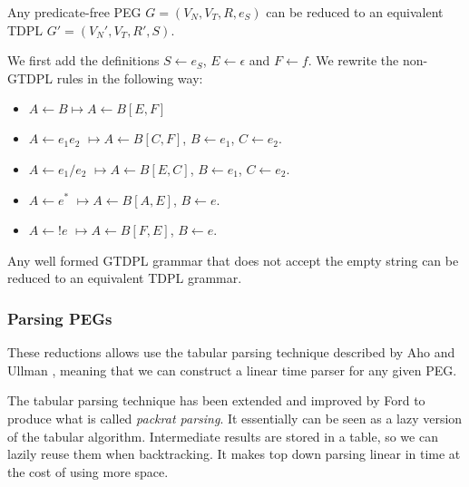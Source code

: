 \begin{frame}
	Any predicate-free PEG $G = (V_N,V_T,R,e_S)$ can be reduced  to an equivalent TDPL $G' = (V_N',V_T,R',S)$.
	
	\begin{block}{}
		We first add the definitions $S \leftarrow e_S$, $E \leftarrow \epsilon$ and $F \leftarrow f$. We rewrite the non-GTDPL rules in the following way:\begin{itemize}
			\item $A \leftarrow B \longmapsto  A \leftarrow B[E, F]$
			\item $A \leftarrow e_1e_2$ $\longmapsto A \leftarrow B[C, F]$, $ B \leftarrow e_1$, $C \leftarrow e_2$.
			\item $A \leftarrow e_1/e_2$ $\longmapsto A \leftarrow B[E, C]$, $ B \leftarrow e_1$, $C \leftarrow e_2$.
			\item $A \leftarrow e^*$ $\longmapsto A \leftarrow B[A, E]$, $ B \leftarrow e$.
			\item $A \leftarrow !e$ $\longmapsto A \leftarrow B[F, E]$, $ B \leftarrow e$.
		\end{itemize}
	\end{block}

	Any well formed GTDPL  grammar that does not accept the empty string  can be reduced to an equivalent TDPL grammar.
\end{frame}

\begin{frame}
	\frametitle{Parsing PEGs}
These reductions allows  use the tabular parsing technique described by Aho and Ullman \cite{10.5555/578789}, meaning that we can construct a linear time parser for any given PEG.
	
	\begin{block}{}
		 The tabular parsing technique has been extended and improved by Ford to produce what is called \emph{packrat parsing}\cite{ford2002packrat}. It essentially can be seen as a lazy  version of the tabular algorithm. Intermediate results are stored in a table, so we can lazily reuse them when backtracking. It makes top down parsing linear in time at the cost of using more space.
	\end{block}
\end{frame}